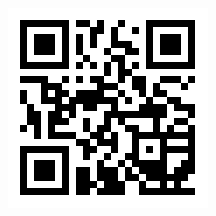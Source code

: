 \documentclass{resume} %
\begin{document}
\begin{flushright}
\includegraphics[scale=0.35]{qr_cv.png}
\end{flushright}





\end{document}
